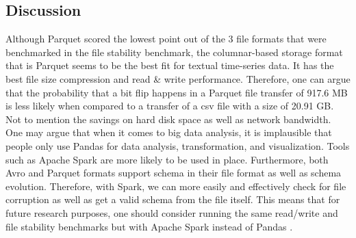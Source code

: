 \subsection{Discussion}
Although Parquet scored the lowest point out of the 3 file formats that were benchmarked in the file stability benchmark, the columnar-based storage format that is Parquet seems to be the best fit for textual time-series data. It has the best file size compression and read \& write performance. Therefore, one can argue that the probability that a bit flip happens in a Parquet file transfer of 917.6 MB is less likely when compared to a transfer of a csv file with a size of 20.91 GB. Not to mention the savings on hard disk space as well as network bandwidth. One may argue that when it comes to big data analysis, it is implausible that people only use Pandas for data analysis, transformation, and visualization. Tools such as Apache Spark are more likely to be used in place. Furthermore, both Avro and Parquet formats support schema in their file format as well as schema evolution. Therefore, with Spark, we can more easily and effectively check for file corruption as well as get a valid schema from the file itself. This means that for future research purposes, one should consider running the same read/write and file stability benchmarks but with Apache Spark instead of Pandas \cite{vohra_apache_2016, cao_data_2017}.